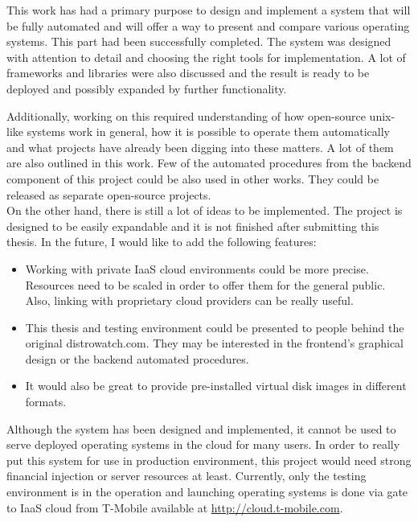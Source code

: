 \documentclass[thesis=B,english]{FITthesis}[2013/04/26]
\begin{document}
\begin{conclusion}
\label{chapter:conclusion}
This work has had a primary purpose to design and implement a system that will be fully automated and will offer a way to present and compare various operating systems. This part had been successfully completed. The system was designed with attention to detail and choosing the right tools for implementation. A lot of frameworks and libraries were also discussed and the result is ready to be deployed and possibly expanded by further functionality.

Additionally, working on this required understanding of how open-source unix-like systems work in general, how it is possible to operate them automatically and what projects have already been digging into these matters. A lot of them are also outlined in this work. Few of the automated procedures from the backend component of this project could be also used in other works. They could be released as separate open-source projects. \\

On the other hand, there is still a lot of ideas to be implemented. The project is designed to be easily expandable and it is not finished after submitting this thesis. In the future, I would like to add the following features:
\begin{itemize}
	\item Working with private IaaS cloud environments could be more precise. Resources need to be scaled in order to offer them for the general public. Also, linking with proprietary cloud providers can be really useful.
	\item This thesis and testing environment could be presented to people behind the original distrowatch.com. They may be interested in the frontend's graphical design or the backend automated procedures.
	\item It would also be great to provide pre-installed virtual disk images in different formats.
\end{itemize}

Although the system has been designed and implemented, it cannot be used to serve deployed operating systems in the cloud for many users. In order to really put this system for use in production environment, this project would need strong financial injection or server resources at least. Currently, only the testing environment is in the operation and launching operating systems is done via gate to IaaS cloud from T-Mobile available at \url{http://cloud.t-mobile.com}.

\end{conclusion}
\end{document}
